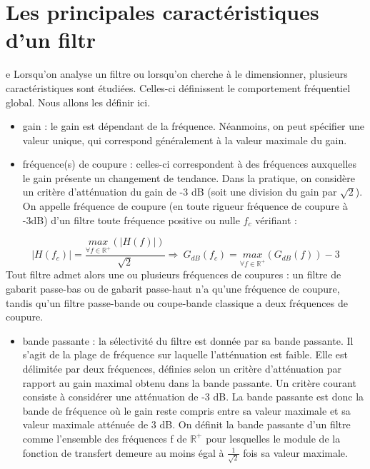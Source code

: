 \documentclass[]{book}
\begin{document}
{	\section{Les principales caractéristiques d'un filtr}e
	Lorsqu'on analyse un filtre ou lorsqu'on cherche à le dimensionner, plusieurs caractéristiques sont étudiées. Celles-ci définissent le comportement fréquentiel global. Nous allons les définir ici. 
	\begin{itemize}
		\item gain : le gain est dépendant de la fréquence. Néanmoins, on peut spécifier une valeur unique, qui correspond généralement à la valeur maximale du gain.
		\item fréquence(s) de coupure : celles-ci correspondent à des fréquences auxquelles le gain présente un changement de tendance. Dans la pratique, on considère un critère d'atténuation du gain de -3 dB (soit une division du gain par $\sqrt{2}$). On appelle fréquence de coupure (en toute rigueur fréquence de coupure à -3dB) d’un filtre toute fréquence positive ou nulle $f_{c}$ vérifiant :
	\end{itemize}
	\begin{equation}\label{key}
	|H(f_{c})|=\frac{\underset{\forall f \in \mathbb{R}^{+}}{max}(|H(f)|)}{\sqrt{2}} \Rightarrow~G_{dB}(f_{c})=\underset{\forall f \in \mathbb{R}^{+}}{max}(G_{dB}(f))-3
	\end{equation}
	Tout filtre admet alors une ou plusieurs fréquences de coupures : un filtre de gabarit passe-bas ou de gabarit passe-haut n’a qu’une fréquence de coupure, tandis qu’un filtre passe-bande ou coupe-bande classique a deux fréquences de coupure.
	\begin{itemize}
		\item bande passante : la sélectivité du filtre est donnée par sa bande passante. Il s'agit de la plage de fréquence sur laquelle l'atténuation est faible. Elle est délimitée par deux fréquences, définies selon un critère d'atténuation par rapport au gain maximal obtenu dans la bande passante. Un critère courant consiste à considérer une atténuation de -3 dB. La bande passante est donc la bande de fréquence où le gain reste compris entre sa valeur maximale et sa valeur maximale atténuée de 3 dB. On définit la bande passante d’un filtre comme l’ensemble des fréquences f de $\mathbb{R}^{+}$ pour lesquelles le module de la fonction de transfert demeure au moins égal à $\frac{1}{\sqrt{2}}$ fois sa valeur maximale. 

\end{itemize}}
\end{document}

